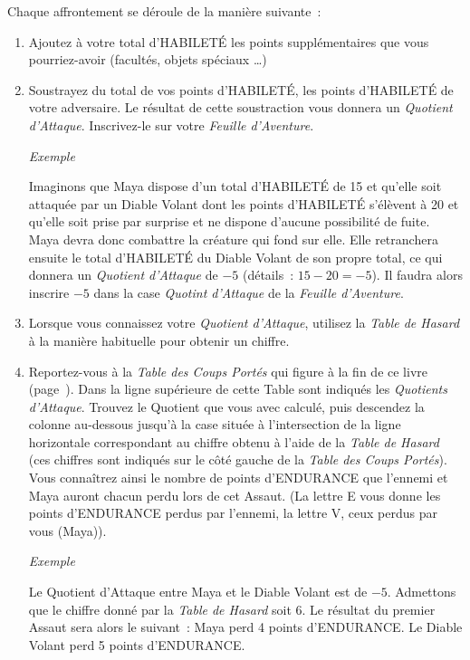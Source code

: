 \documentclass[10pt]{book}
\begin{document}
Chaque affrontement se déroule de la manière suivante~:
\begin{enumerate}
  \item Ajoutez à votre total d'HABILETÉ les points supplémentaires que vous pourriez-avoir
  (facultés, objets spéciaux …)
  \item Soustrayez du total de vos points d'HABILETÉ, les points d'HABILETÉ de
  votre adversaire. Le résultat de cette soustraction vous donnera un
  \textit{Quotient d'Attaque}. Inscrivez-le sur votre \textit{Feuille d'Aventure}.
  
  \begin{center}
    \textit{Exemple}
  \end{center}
  Imaginons que Maya dispose d'un total d'HABILETÉ de 15 et qu'elle soit attaquée
  par un Diable Volant dont les points d'HABILETÉ s'élèvent à 20 et qu'elle soit
  prise par surprise et ne dispone d'aucune possibilité de fuite. Maya devra donc
  combattre la créature qui fond sur elle.
  Elle retranchera ensuite le total d'HABILETÉ du Diable Volant de son propre total,
  ce qui donnera un \textit{Quotient d'Attaque} de $-5$ (détails~: $15-20=-5$). Il faudra
  alors inscrire $-5$ dans la case \textit{Quotint d'Attaque} de la \textit{Feuille
  d'Aventure}.\\
  
  \item Lorsque vous connaissez votre \textit{Quotient d'Attaque}, utilisez la
  \textit{Table de Hasard} à la manière habituelle pour obtenir un chiffre.

  \item Reportez-vous à la \textit{Table des Coups Portés} qui figure
  à la fin de ce livre (page~\pageref{table_coups_portes}). Dans la ligne supérieure
  de cette Table sont indiqués les \textit{Quotients d'Attaque}. Trouvez le Quotient
  que vous avec calculé, puis descendez la colonne au-dessous jusqu'à la case
  située à l'intersection de la ligne horizontale correspondant au chiffre obtenu
  à l'aide de la \textit{Table de Hasard} (ces chiffres sont indiqués sur le côté
  gauche de la \textit{Table des Coups Portés}). Vous connaîtrez ainsi le nombre
  de points d'ENDURANCE que l'ennemi et Maya auront chacun perdu lors de cet
  Assaut. (La lettre E vous donne les points d'ENDURANCE perdus par l'ennemi,
  la lettre V, ceux perdus par vous (Maya)).

  \begin{center}
    \textit{Exemple}
  \end{center}
  Le Quotient d'Attaque entre Maya et le Diable Volant est de $-5$. Admettons
  que le chiffre donné par la \textit{Table de Hasard} soit 6. Le résultat du premier
  Assaut sera alors le suivant~: Maya perd 4 points d'ENDURANCE. Le Diable Volant
  perd 5 points d'ENDURANCE.


\end{enumerate}
\end{document}
